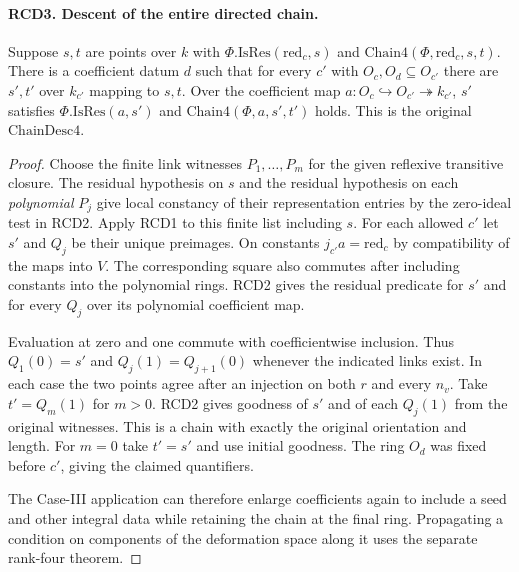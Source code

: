 \paragraph{RCD3. Descent of the entire directed chain.}
Suppose $s,t$ are points over $k$ with
$\Phi.\mathrm{IsRes}(\mathrm{red}_c,s)$ and
$\mathrm{Chain4}(\Phi,\mathrm{red}_c,s,t)$. There is a coefficient
datum $d$ such that for every $c'$ with $O_c,O_d\subseteq O_{c'}$
there are $s',t'$ over $k_{c'}$ mapping to $s,t$. Over the
coefficient map $a:O_c\hookrightarrow O_{c'}\twoheadrightarrow k_{c'}$,
$s'$ satisfies $\Phi.\mathrm{IsRes}(a,s')$ and
$\mathrm{Chain4}(\Phi,a,s',t')$ holds. This is the original
$\mathrm{ChainDesc4}$.
\begin{proof}
Choose the finite link witnesses $P_1,\ldots,P_m$ for the given
reflexive transitive closure. The residual hypothesis on $s$ and
the residual hypothesis on each \emph{polynomial} $P_j$ give local
constancy of their representation entries by the zero-ideal test in
RCD2. Apply RCD1 to this finite list including $s$. For each allowed
$c'$ let $s'$ and $Q_j$ be their unique preimages. On constants
$j_{c'}a=\mathrm{red}_c$ by compatibility of the maps into $V$.
The corresponding square also commutes after including constants
into the polynomial rings. RCD2 gives the residual predicate for
$s'$ and for every $Q_j$ over its polynomial coefficient map.

Evaluation at zero and one commute with coefficientwise inclusion.
Thus $Q_1(0)=s'$ and $Q_j(1)=Q_{j+1}(0)$ whenever the indicated
links exist. In each case the two points agree after an injection
on both $r$ and every $n_v$. Take $t'=Q_m(1)$ for $m>0$.
RCD2 gives goodness of $s'$ and of each $Q_j(1)$ from the original
witnesses. This is a chain with exactly the original orientation
and length. For $m=0$ take $t'=s'$ and use initial goodness.
The ring $O_d$ was fixed before $c'$, giving the claimed quantifiers.

The Case-III application can therefore enlarge coefficients again
to include a seed and other integral data while retaining the chain
at the final ring. Propagating a condition on components of the
deformation space along it uses the separate rank-four theorem.
\end{proof}
